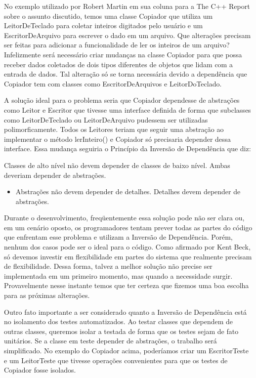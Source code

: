 No exemplo utilizado por Robert Martin em sua coluna para a The C++ Report sobre o assunto discutido, temos uma classe Copiador que utiliza um LeitorDeTeclado para coletar inteiros digitados pelo usuário e um EscritorDeArquivo para escrever o dado em um arquivo. Que alterações precisam ser feitas  para adicionar a funcionalidade de ler os inteiros de um arquivo? Infelizmente será necessário criar mudanças na classe Copiador para que possa receber dados coletados de dois tipos diferentes de objetos que lidam com a entrada de dados. Tal alteração só se torna necessária devido a dependência que Copiador tem com classes como EscritorDeArquivos e LeitorDoTeclado.
	
A solução ideal para o problema seria que Copiador dependesse de abstrações como Leitor e Escritor que tivesse uma interface definida de forma que subclasses como LeitorDeTeclado ou LeitorDeArquivo pudessem ser utilizadas polimorficamente. Todos os Leitores teriam que seguir uma abstração ao implementar o método lerInteiro() e Copiador só precisaria depender dessa interface. Essa mudança seguiria o Princípio da Inversão de Dependência que diz:
	
Classes de alto nível não devem depender de classes de baixo nível. Ambas deveriam depender de abstrações.

\begin{itemize}
	\item Abstrações não devem depender de detalhes. Detalhes devem depender de abstrações.
\end{itemize}

Durante o desenvolvimento, freqüentemente essa solução pode não ser clara ou, em um cenário oposto, os programadores tentam prever todas as partes do código que enfrentam esse problema e utilizam a Inversão de Dependência. Porém, nenhum dos casos pode ser o ideal para o código. Como afirmado por Kent Beck, só devemos investir em flexibilidade em partes do sistema que realmente precisam de flexibilidade. Dessa forma, talvez a melhor solução não precise ser implementada em um primeiro momento, mas quando a necessidade surgir. Provavelmente nesse instante temos que ter certeza que fizemos uma boa escolha para as próximas alterações.
	
Outro fato importante a ser considerado quanto a Inversão de Dependência está no isolamento dos testes automatizados. Ao testar classes que dependem de outras classes, queremos isolar a testada de forma que os testes sejam de fato unitários. Se a classe em teste depender de abstrações, o trabalho será simplificado. No exemplo do Copiador acima, poderíamos criar um EscritorTeste e um LeitorTeste que tivesse operações convenientes para que os testes de Copiador fosse isolados.


